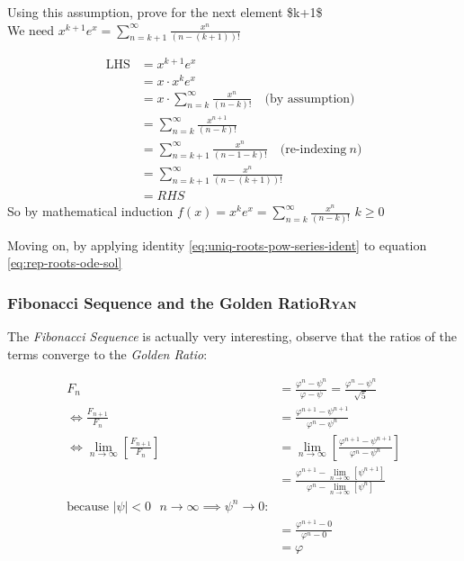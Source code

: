 \documentclass[11pt]{article}
\begin{document}
\begin{enumerate}
\begin{enumerate}
\begin{enumerate}
Using this assumption, prove for the next element \$k+1\$\\

We need \(x^{k+1}e^x = \sum_{n=k+1}^\infty\frac{x^n}{(n-(k+1))!}\)

\begin{align*}
    \text{LHS} &= x^{k+1}e^x\\
    &= x\cdot x^{k}e^x\\
    &= x\cdot \sum_{n=k}^\infty\frac{x^n}{(n-k)!} \quad \text{(by assumption)}\\
    &= \sum_{n=k}^\infty\frac{x^{n+1}}{(n-k)!}\\
    &= \sum_{n=k+1}^\infty\frac{x^n}{(n-1-k)!} \quad \text{(re-indexing}~ n\text{)}\\
    &= \sum_{n=k+1}^\infty\frac{x^n}{(n-(k+1))!}\\
    &= RHS
\end{align*}
So by mathematical induction \(f(x) = x^ke^x = \sum_{n=k}^\infty\frac{x^n}{(n-k)!}\)  \(k \ge 0\)

Moving on, by applying identity \eqref{eq:uniq-roots-pow-series-ident} to equation \eqref{eq:rep-roots-ode-sol}
\end{enumerate}
\end{enumerate}
\end{enumerate}

\subsubsection{Fibonacci Sequence and the Golden Ratio\hfill{}\textsc{Ryan}}
\label{fib-golden-ratio-proof}
The \emph{Fibonacci Sequence} is actually very interesting, observe that the ratios of the terms converge to the \emph{Golden Ratio}:

\begin{align*}
    F_n &= \frac{\varphi^n-\psi^n}{\varphi-\psi} = \frac{\varphi^n-\psi^n}{\sqrt 5} \\
    \iff \frac{F_{n+1}}{F_n}	&= \frac{\varphi^{n+ 1} - \psi^{n+  1}}{\varphi^{n} - \psi^{n}} \\
    \iff \lim_{n \rightarrow \infty}\left[ \frac{F_{n+1}}{F_n} \right]	&= \lim_{n \rightarrow \infty}\left[ \frac{\varphi^{n+ 1} - \psi^{n+  1}}{\varphi^{n} - \psi^{n}} \right] \\
&= \frac{\varphi^{n+ 1} -\lim_{n \rightarrow \infty}\left[ \psi^{n +  1} \right] }{\varphi^{n} - \lim_{n \rightarrow \infty}\left[ \psi^n \right] } \\
\text{because $\mid \psi \mid < 0$ $n \rightarrow \infty \implies \psi^{n} \rightarrow 0$:} \\
&= \frac{\varphi^{n+  1} -  0}{\varphi^{n} -  0} \\
&= \varphi
\end{align*}
\end{document}
